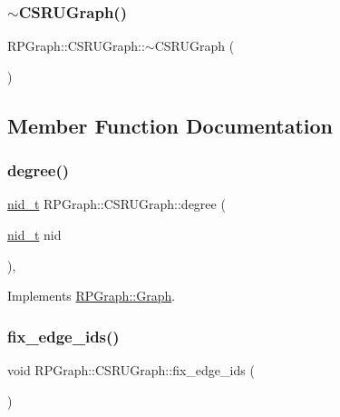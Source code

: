 \subsubsection{\texorpdfstring{$\sim$\+C\+S\+R\+U\+Graph()}{~CSRUGraph()}}
{\footnotesize\ttfamily R\+P\+Graph\+::\+C\+S\+R\+U\+Graph\+::$\sim$\+C\+S\+R\+U\+Graph (\begin{DoxyParamCaption}{ }\end{DoxyParamCaption})}



\subsection{Member Function Documentation}
\mbox{\label{classRPGraph_1_1CSRUGraph_ae2f3bb7a5ee2b53c88145a0cee6ed277}} 
\subsubsection{\texorpdfstring{degree()}{degree()}}
{\footnotesize\ttfamily \mbox{\hyperlink{namespaceRPGraph_ab3ae34f1ab88e48f43794c30c8697b74}{nid\+\_\+t}} R\+P\+Graph\+::\+C\+S\+R\+U\+Graph\+::degree (\begin{DoxyParamCaption}\item[{\mbox{\hyperlink{namespaceRPGraph_ab3ae34f1ab88e48f43794c30c8697b74}{nid\+\_\+t}}}]{nid }\end{DoxyParamCaption})\hspace{0.3cm}{\ttfamily [override]}, {\ttfamily [virtual]}}



Implements \mbox{\hyperlink{classRPGraph_1_1Graph_a8a95d1f403c3d9860cf7399abc820c7d}{R\+P\+Graph\+::\+Graph}}.

\mbox{\label{classRPGraph_1_1CSRUGraph_a5394625002cf95dbeac709f230d9f618}} 
\subsubsection{\texorpdfstring{fix\+\_\+edge\+\_\+ids()}{fix\_edge\_ids()}}
{\footnotesize\ttfamily void R\+P\+Graph\+::\+C\+S\+R\+U\+Graph\+::fix\+\_\+edge\+\_\+ids (\begin{DoxyParamCaption}{ }\end{DoxyParamCaption})}

